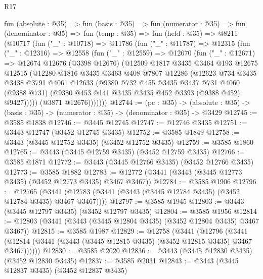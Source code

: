 \begin{lexlean}{R17}
\begin{coremodule}
  fun (absolute : @35) =>
  fun (basis : @35) =>
  fun (numerator : @35) =>
  fun (denominator : @35) =>
  fun (temp : @35) =>
  fun (held : @35) =>
  @8211
    (@10717
      (fun ("_" : @10718) =>
      @11786
        (fun ("_" : @11787) =>
        @12315
          (fun ("_" : @12316) =>
          @12558
            (fun ("_" : @12559) =>
            @12670
              (fun ("_" : @12671) =>
              @12674
                @12676
                (@3398 @12676)
                (@12509
                  @1817
                  @3435
                  @3464
                  @193
                  @12675
                  @12515
                  (@12280
                    @1816
                    @3435
                    @3463
                    @408
                    @7807
                    @12286
                    (@12623
                      @734
                      @3435
                      @3438
                      @3791
                      @4061
                      @12633
                      (@9380
                        @732
                        @455
                        @3435
                        @3437
                        @731
                        @4060
                        (@9388 @731)
                        (@9380 @453 @141 @3435 @3435 @452 @3393 (@9388 @452) @9427)))))
                (@3871 @12676)))))))
@12744 := (pc : @35) ->
  (absolute : @35) -> (basis : @35) -> (numerator : @35) -> (denominator : @35) -> @3429
@12745 := @3585 @1838
@12746 := @3445 @12745
@12747 := @12746 @3435
@12751 := @3443 @12747 (@3452 @12745 @3435)
@12752 := @3585 @1849
@12758 := @3443 (@3445 @12752 @3435) (@3452 @12752 @3435)
@12759 := @3585 @1860
@12765 := @3443 (@3445 @12759 @3435) (@3452 @12759 @3435)
@12766 := @3585 @1871
@12772 := @3443 (@3445 @12766 @3435) (@3452 @12766 @3435)
@12773 := @3585 @1882
@12783 := @12772 (@3441 (@3443 (@3445 @12773 @3435) (@3452 @12773 @3435) @3467 @3467))
@12784 := @3585 @1906
@12796 := @12765
    (@3441 (@12783 (@3441 (@3443 (@3445 @12784 @3435) (@3452 @12784 @3435) @3467 @3467))))
@12797 := @3585 @1945
@12803 := @3443 (@3445 @12797 @3435) (@3452 @12797 @3435)
@12804 := @3585 @1956
@12814 := @12803 (@3441 (@3443 (@3445 @12804 @3435) (@3452 @12804 @3435) @3467 @3467))
@12815 := @3585 @1987
@12829 := @12758
    (@3441
      (@12796
        (@3441 (@12814 (@3441 (@3443 (@3445 @12815 @3435) (@3452 @12815 @3435) @3467 @3467))))))
@12830 := @3585 @2020
@12836 := @3443 (@3445 @12830 @3435) (@3452 @12830 @3435)
@12837 := @3585 @2031
@12843 := @3443 (@3445 @12837 @3435) (@3452 @12837 @3435)

\end{coremodule}
\end{lexlean}
